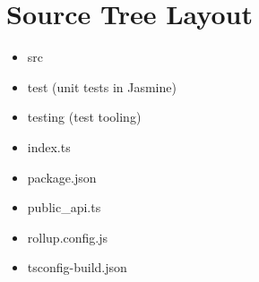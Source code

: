 \section{Source Tree Layout}


\begin{itemize}
  \item src
  \item test (unit tests in Jasmine)
  \item testing (test tooling)
\end{itemize}


\begin{itemize}
  \item index.ts
  \item package.json
  \item public\_api.ts
  \item rollup.config.js
  \item tsconfig-build.json
\end{itemize}


